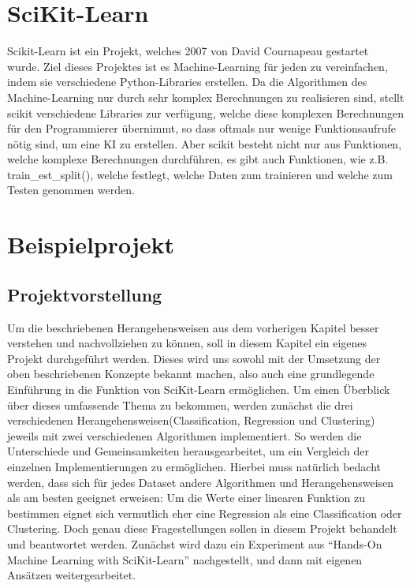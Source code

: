 \chapter{SciKit-Learn}
\label{chap:sciKitLearn}
Scikit-Learn ist ein Projekt, welches 2007 von David Cournapeau gestartet wurde\cite{SKL}. Ziel dieses Projektes ist es Machine-Learning für jeden zu vereinfachen, indem sie verschiedene Python-Libraries erstellen. Da die Algorithmen des Machine-Learning nur durch sehr komplex Berechnungen zu realisieren sind, stellt scikit verschiedene Libraries zur verfügung, welche diese komplexen Berechnungen für den Programmierer übernimmt, so dass oftmals nur wenige Funktionsaufrufe nötig sind, um eine KI zu erstellen. Aber scikit besteht nicht nur aus Funktionen, welche komplexe Berechnungen durchführen, es gibt auch Funktionen, wie z.B. train\_est\_split(), welche festlegt, welche Daten zum trainieren und welche zum Testen genommen werden.

\chapter{Beispielprojekt}
\label{chap:Beispielprojekt}

\section{Projektvorstellung}
\label{sec:projektvorstellung}
Um die beschriebenen Herangehensweisen aus dem vorherigen Kapitel besser verstehen und nachvollziehen zu können, soll in diesem Kapitel ein eigenes Projekt durchgeführt werden. Dieses wird uns sowohl mit der Umsetzung der oben beschriebenen Konzepte bekannt machen, also auch eine grundlegende Einführung in die Funktion von SciKit-Learn ermöglichen. 
Um einen Überblick über dieses umfassende Thema zu bekommen, werden zunächst die drei verschiedenen Herangehensweisen(Classification, Regression und Clustering) jeweils mit zwei verschiedenen Algorithmen implementiert. So werden die Unterschiede und Gemeinsamkeiten herausgearbeitet, um ein Vergleich der einzelnen Implementierungen zu ermöglichen. Hierbei muss natürlich bedacht werden, dass sich für jedes Dataset andere Algorithmen und Herangehensweisen als am besten geeignet erweisen: Um die Werte einer linearen Funktion zu bestimmen eignet sich vermutlich eher eine Regression als eine Classification oder Clustering. Doch genau diese Fragestellungen sollen in diesem Projekt behandelt und beantwortet werden.
Zunächst wird dazu ein Experiment aus “Hands-On Machine Learning with SciKit-Learn” nachgestellt, und dann mit eigenen Ansätzen weitergearbeitet.

